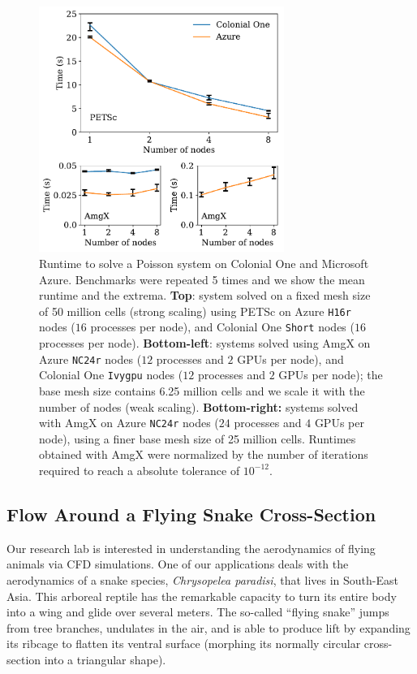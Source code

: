 \documentclass[10pt,journal,compsoc]{IEEEtran}
\begin{document}
\begin{figure}[!h]
    \centering
    \includegraphics[width=8cm]{poisson_time_vs_nodes.pdf}
    \caption{Runtime to solve a Poisson system on Colonial One and Microsoft Azure. Benchmarks were repeated 5 times and we show the mean runtime and the extrema. \textbf{Top}: system solved on a fixed mesh size of 50 million cells (strong scaling) using PETSc on Azure \texttt{H16r} nodes ($16$ processes per node), and Colonial One \texttt{Short} nodes ($16$ processes per node). \textbf{Bottom-left}:  systems solved using AmgX on Azure \texttt{NC24r} nodes ($12$ processes and $2$ GPUs per node), and Colonial One \texttt{Ivygpu} nodes ($12$ processes and $2$ GPUs per node); the base mesh size contains 6.25 million cells and we scale it with the number of nodes (weak scaling). \textbf{Bottom-right:} systems solved with AmgX on Azure \texttt{NC24r} nodes ($24$ processes and $4$ GPUs per node), using a finer base mesh size of 25 million cells. Runtimes obtained with AmgX were normalized by the number of iterations required to reach a absolute tolerance of $10^{-12}$.}
    \label{fig:poisson_benchmarks}
\end{figure}

\subsection{Flow Around a Flying Snake Cross-Section}\label{subsec:snake}

Our research lab is interested in understanding the aerodynamics of flying animals via CFD simulations.
One of our applications deals with the aerodynamics of a snake species, \textit{Chrysopelea paradisi}, that lives in South-East Asia.
This arboreal reptile has the remarkable capacity to turn its entire body into a wing and glide over several meters\cite{socha_2011}.
The so-called ``flying snake'' jumps from tree branches, undulates in the air, and is able to produce lift by expanding its ribcage to flatten its ventral surface (morphing its normally circular cross-section into a triangular shape).
\end{document}
